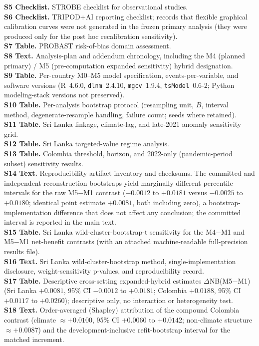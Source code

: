 \documentclass[11pt,a4paper]{article}
\begin{document}
\textbf{S5 Checklist.} STROBE checklist for observational studies.\\
\textbf{S6 Checklist.} TRIPOD+AI reporting checklist; records that flexible graphical calibration curves were not generated in the frozen primary analysis (they were produced only for the post hoc recalibration sensitivity).\\
\textbf{S7 Table.} PROBAST risk-of-bias domain assessment.\\
\textbf{S8 Text.} Analysis-plan and addendum chronology, including the M4 (planned primary) / M5 (pre-computation expanded sensitivity) hybrid designation.\\
\textbf{S9 Table.} Per-country M0--M5 model specification, events-per-variable, and software versions (R~4.6.0, \texttt{dlnm}~2.4.10, \texttt{mgcv}~1.9.4, \texttt{tsModel}~0.6-2; Python modeling-stack versions not preserved).\\
\textbf{S10 Table.} Per-analysis bootstrap protocol (resampling unit, $B$, interval method, degenerate-resample handling, failure count; seeds where retained).\\
\textbf{S11 Table.} Sri Lanka linkage, climate-lag, and late-2021 anomaly sensitivity grid.\\
\textbf{S12 Table.} Sri Lanka targeted-value regime analysis.\\
\textbf{S13 Table.} Colombia threshold, horizon, and 2022-only (pandemic-period subset) sensitivity results.\\
\textbf{S14 Text.} Reproducibility-artifact inventory and checksums. The committed and independent-reconstruction bootstraps yield marginally different percentile intervals for the raw M5$-$M1 contrast ($-0.0012$ to $+0.0181$ versus $-0.0025$ to $+0.0180$; identical point estimate $+0.0081$, both including zero), a bootstrap-implementation difference that does not affect any conclusion; the committed interval is reported in the main text.\\
\textbf{S15 Table.} Sri Lanka wild-cluster-bootstrap-t sensitivity for the M4$-$M1 and M5$-$M1 net-benefit contrasts (with an attached machine-readable full-precision results file).\\
\textbf{S16 Text.} Sri Lanka wild-cluster-bootstrap method, single-implementation disclosure, weight-sensitivity p-values, and reproducibility record.\\
\textbf{S17 Table.} Descriptive cross-setting expanded-hybrid estimates $\Delta$NB(M5$-$M1) (Sri Lanka $+0.0081$, 95\% CI $-0.0012$ to $+0.0181$; Colombia $+0.0188$, 95\% CI $+0.0117$ to $+0.0260$); descriptive only, no interaction or heterogeneity test.\\
\textbf{S18 Text.} Order-averaged (Shapley) attribution of the compound Colombia contrast (climate $\approx+0.0100$, 95\% CI $+0.0060$ to $+0.0142$; non-climate structure $\approx+0.0087$) and the development-inclusive refit-bootstrap interval for the matched increment.
\endgroup
\end{document}
